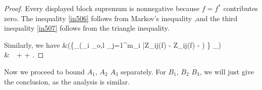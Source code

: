 \documentclass[twoside,11pt]{article}
\newcommand{\rev}[1]{{\color{revisionred}#1}}
\begin{document}
\begin{proof}
\rev{Every displayed block supremum is nonnegative because $f=f^*$ contributes zero.} The inequality \eqref{in506} follows from Markov’s inequality
  ,and the third inequality \eqref{in507} follows from the triangle inequality.   


Similarly, we have 
\bea 
&\sP\left(\left\{\sup_{}\left(\sum_{i \in {}_{o,l}} \sum_{j=1}^{m_i} \rev{\bar Z_{ij}(f)} - \rev{\hat Z_{ij}(f)} - \right) \rev{\geq} \right\} \cap \Omega_\beta\right) \\
& \,\leq\, 
 +  + . 
\bea 
\end{proof}
Now we proceed to bound $A_1$, $A_2$ $A_3$ separately. 
For $B_1$, $B_2$ $B_3$, we will just give the conclusion, as the analysis is similar.  
\end{document}

